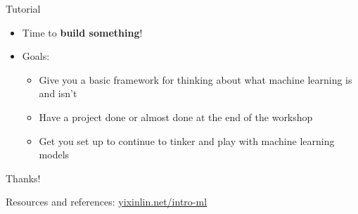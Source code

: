 \documentclass{beamer}
\begin{document}
\begin{frame}{Tutorial}
\begin{itemize}
    \item Time to \textbf{build something}!
    \item Goals:
      \begin{itemize}
        \item Give you a basic framework for thinking about what machine learning is and isn't
        \item Have a project done or almost done at the end of the workshop
        \item Get you set up to continue to tinker and play with machine learning models
      \end{itemize}
\end{itemize}

\end{frame}

\begin{frame}
\Huge{\centerline{Thanks!}}

\Large{\centerline{Resources and references: \href{http://yixinlin.net/intro-ml}{yixinlin.net/intro-ml}}}

\end{frame}

\end{document}
